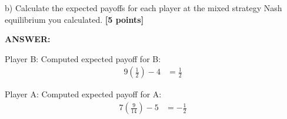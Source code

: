 \documentclass{article}
\begin{document}
\vspace{5mm}

\noindent b)  Calculate the expected payoffs for each player at the mixed strategy Nash equilibrium 
you calculated. \textbf{[5 points]}

\vspace{3mm}

\noindent \textbf{ANSWER:}

%
%

Player B:
Computed expected payoff for B:
\begin{align}
9(\frac{1}{2}) - 4 &= \frac{1}{2}
\end{align}

Player A:
Computed expected payoff for A:
\begin{align}
7(\frac{9}{14}) - 5 &= -\frac{1}{2}	
\end{align}
\end{document}
